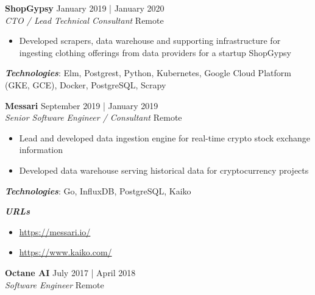 \documentclass[a4paper]{article}
\newenvironment{jobdetails}%
    {\list{}{\leftmargin=4mm}\item[]}%
    {\endlist}
\begin{document}
\textbf{ShopGypsy} \hfill January 2019 | January 2020 \\
\textit{CTO / Lead Technical Consultant} \hfill Remote \\
\vspace{2mm}

\begin{jobdetails}
\begin{itemize}
    \item Developed scrapers, data warehouse and supporting infrastructure for ingesting clothing offerings from data providers for a startup ShopGypsy
\end{itemize}
\vspace{2mm}

\textbf{\textit{Technologies}}: Elm, Postgrest, Python, Kubernetes, Google Cloud Platform (GKE, GCE), Docker, PostgreSQL, Scrapy

\end{jobdetails}
\vspace{1mm}


\textbf{Messari} \hfill September 2019 | January 2019 \\
\textit{Senior Software Engineer / Consultant } \hfill Remote \\
\vspace{2mm}

\begin{jobdetails}
\begin{itemize}
    \item Lead and developed data ingestion engine for real-time crypto stock exchange information
    \item Developed data warehouse serving historical data for cryptocurrency projects
\end{itemize}
\vspace{2mm}

\textbf{\textit{Technologies}}: Go, InfluxDB, PostgreSQL, Kaiko

\textbf{\textit{URLs}}
\begin{itemize} \itemsep 1pt
	\item \url{https://messari.io/}
    \item \url{https://www.kaiko.com/}
\end{itemize}

\end{jobdetails}
\vspace{1mm}


\textbf{Octane AI} \hfill July 2017 | April 2018 \\
\textit{Software Engineer} \hfill Remote \\
\vspace{2mm}
\end{document}
